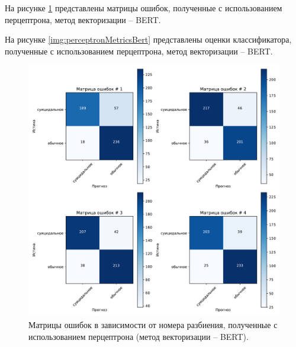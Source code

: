На рисунке \ref{img:perceptronMatrBert} представлены матрицы ошибок, полученные с использованием перцептрона, метод векторизации -- BERT.

На рисунке \ref{img:perceptronMetricsBert} представлены оценки классификатора, полученные с использованием перцептрона, метод векторизации -- BERT.

\begin{figure}[H]
	\centering
	\includegraphics[width=\textwidth]{inc/plots/perceptronMatrBert.pdf}
	\caption{ Матрицы ошибок в зависимости от номера разбиения, полученные с использованием перцептрона (метод векторизации -- BERT). }
	\label{img:perceptronMatrBert}
\end{figure}

